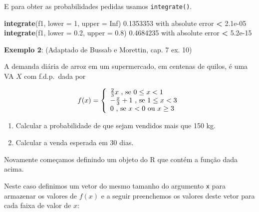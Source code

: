 \documentclass[10pt,a4paper]{book}
\newenvironment{Shaded}{\begin{snugshade}}{\end{snugshade}}
\newcommand{\KeywordTok}[1]{\textcolor[rgb]{0.13,0.29,0.53}{\textbf{#1}}}
\newcommand{\DataTypeTok}[1]{\textcolor[rgb]{0.13,0.29,0.53}{#1}}
\newcommand{\DecValTok}[1]{\textcolor[rgb]{0.00,0.00,0.81}{#1}}
\newcommand{\FloatTok}[1]{\textcolor[rgb]{0.00,0.00,0.81}{#1}}
\newcommand{\StringTok}[1]{\textcolor[rgb]{0.31,0.60,0.02}{#1}}
\newcommand{\OtherTok}[1]{\textcolor[rgb]{0.56,0.35,0.01}{#1}}
\newcommand{\OperatorTok}[1]{\textcolor[rgb]{0.81,0.36,0.00}{\textbf{#1}}}
\newcommand{\NormalTok}[1]{#1}
\providecommand{\tightlist}{%
  \setlength{\itemsep}{0pt}\setlength{\parskip}{0pt}}
\begin{document}
E para obter as probabilidades pedidas usamos \texttt{integrate()}.

\begin{Shaded}
\begin{Highlighting}[]
\KeywordTok{integrate}\NormalTok{(f1, }\DataTypeTok{lower =} \DecValTok{1}\NormalTok{, }\DataTypeTok{upper =} \OtherTok{Inf}\NormalTok{)}
\FloatTok{0.1353353}\NormalTok{ with absolute error }\OperatorTok{<}\StringTok{ }\FloatTok{2.1e-05}
\KeywordTok{integrate}\NormalTok{(f1, }\DataTypeTok{lower =} \FloatTok{0.2}\NormalTok{, }\DataTypeTok{upper =} \FloatTok{0.8}\NormalTok{)}
\FloatTok{0.4684235}\NormalTok{ with absolute error }\OperatorTok{<}\StringTok{ }\FloatTok{5.2e-15}
\end{Highlighting}
\end{Shaded}

\textbf{Exemplo 2}: (Adaptado de Bussab e Morettin, cap. 7 ex. 10)

A demanda diária de arroz em um supermercado, em centenas de quilos, é
uma VA \(X\) com f.d.p.~dada por

\begin{eqnarray}
  f(x) = \left\{ \begin{array}{ll}
      \frac{2}{3}x \mbox{ , se $0 \leq x < 1$} \cr
      -\frac{x}{3} + 1 \mbox{ , se $ 1 \leq x < 3$} \cr
      0            \mbox{ , se $x < 0$  ou  $x \geq 3$}
    \end{array} \right.
\end{eqnarray}

\begin{enumerate}
\def\labelenumi{\alph{enumi}.}
\tightlist
\item
  Calcular a probabilidade de que sejam vendidos mais que 150 kg.
\item
  Calcular a venda esperada em 30 dias.
\end{enumerate}

Novamente começamos definindo um objeto do R que contém a função dada
acima.

Neste caso definimos um vetor do mesmo tamanho do argumento \texttt{x}
para armazenar os valores de \(f(x)\) e a seguir preenchemos os valores
deste vetor para cada faixa de valor de \(x\):
\end{document}
